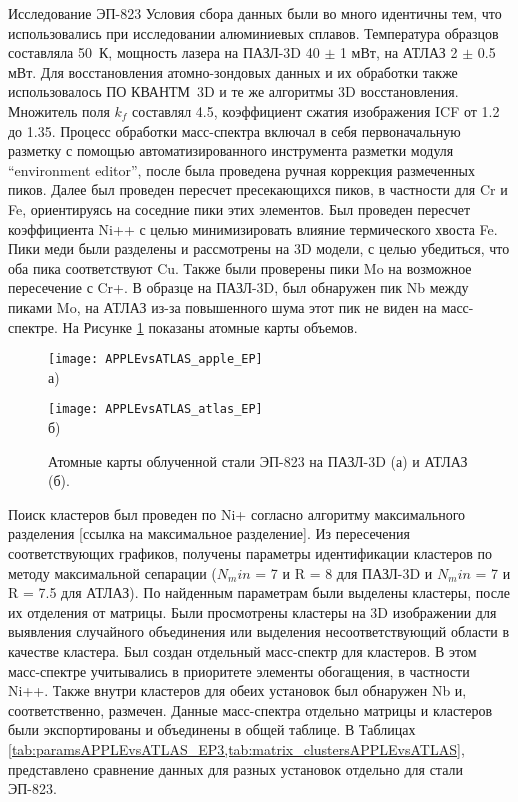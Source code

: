 Исследование ЭП-823
Условия сбора данных были во много идентичны тем, что использовались при исследовании алюминиевых сплавов. Температура образцов составляла 50~К, мощность лазера на ПАЗЛ-3D 40 $\pm$ 1 мВт, на АТЛАЗ 2 $\pm$ 0.5 мВт. Для восстановления атомно-зондовых данных и их обработки также использовалось ПО КВАНТМ~3D и те же алгоритмы 3D восстановления. Множитель поля $k_f$ составлял 4.5, коэффициент сжатия изображения ICF от 1.2 до 1.35. Процесс обработки масс-спектра включал в себя первоначальную разметку с помощью автоматизированного инструмента разметки модуля “environment editor”, после была проведена ручная коррекция размеченных пиков. Далее был проведен пересчет пресекающихся пиков, в частности для Cr и Fe, ориентируясь на соседние пики этих элементов. Был проведен пересчет коэффициента Ni++ с целью минимизировать влияние термического хвоста Fe. Пики меди были разделены и рассмотрены на 3D модели, с целью убедиться, что оба пика соответствуют Cu. Также были проверены пики Mo на возможное пересечение с Cr+. В образце на ПАЗЛ-3D, был обнаружен пик Nb между пиками Mo, на АТЛАЗ из-за повышенного шума этот пик не виден на масс-спектре. На Рисунке \cref{fig:APPLEvsATLAS_EP} показаны атомные карты объемов.

\begin{figure}[h!tb]
	\begin{minipage}[b][][b]{0.49\textwidth}\centering
		\texttt{[image: APPLEvsATLAS\_apple\_EP]} \\ а)
	\end{minipage}
	\begin{minipage}[b][][b]{0.49\textwidth}\centering
		\texttt{[image: APPLEvsATLAS\_atlas\_EP]} \\ б)
	\end{minipage}
	\caption{Атомные карты облученной стали ЭП-823 на ПАЗЛ-3D (а) и АТЛАЗ (б).}
	\label{fig:APPLEvsATLAS_EP}
\end{figure} 

Поиск кластеров был проведен по Ni+ согласно алгоритму максимального разделения [ссылка на максимальное разделение]. Из пересечения соответствующих графиков, получены параметры идентификации кластеров по методу максимальной сепарации ($N_min$ = 7 и R = 8 для ПАЗЛ-3D и $N_min$ = 7 и R = 7.5 для АТЛАЗ). По найденным параметрам были выделены кластеры, после их отделения от матрицы. Были просмотрены кластеры на 3D изображении для выявления случайного объединения или выделения несоответствующий области в качестве кластера. Был создан отдельный масс-спектр для кластеров. В этом масс-спектре учитывались в приоритете элементы обогащения, в частности Ni++. Также внутри кластеров для обеих установок был обнаружен Nb и, соответственно, размечен. Данные масс-спектра отдельно матрицы и кластеров были экспортированы и объединены в общей таблице. В Таблицах \cref{tab:paramsAPPLEvsATLAS_EP3,tab:matrix_clustersAPPLEvsATLAS}, представлено сравнение данных для разных установок отдельно для стали ЭП-823.

